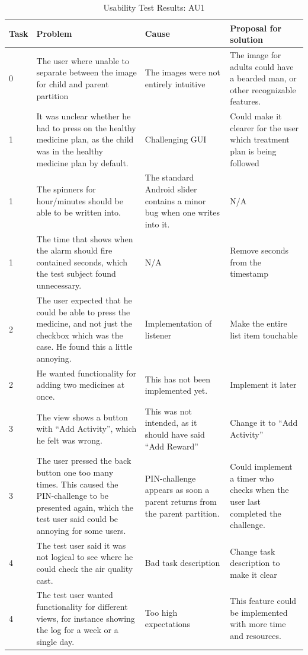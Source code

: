 \begin{singlespacing}
\begin{table}[H]
\centering
\begin{tabular}{| p{1.0cm} | p{4.0cm} | p{4.5cm} | p{4.0cm} |}
\hline
	\textbf{Task} & \textbf{Problem} & \textbf{Cause} & \textbf{Proposal for solution} \\
	\hline
	0 & The user where unable to separate between the image for child and parent partition & The images were not entirely intuitive & The image for adults could have a bearded man, or other recognizable features. \\
	\hline
	1 & It was unclear whether he had to press on the healthy medicine plan, as the child was in the healthy medicine plan by default. & Challenging GUI & Could make it clearer for the user which treatment plan is being followed \\
	\hline
	1 & The spinners for hour/minutes should be able to be written into. & The standard Android slider contains a minor bug when one writes into it.  & N/A \\
	\hline
	1 & The time that shows when the alarm should fire contained seconds, which the test subject found unnecessary. & N/A & Remove seconds from the timestamp \\
	\hline
	2 & The user expected that he could be able to press the medicine, and not just the checkbox which was the case. He found this a little annoying. & Implementation of listener & Make the entire list item touchable \\
	\hline
	2 & He wanted functionality for adding two medicines at once.  & This has not been implemented yet.  & Implement it later \\
	\hline
	3 & The view shows a button with ``Add Activity'', which he felt was wrong. & This was not intended, as it should have said ``Add Reward'' & Change it to ``Add Activity'' \\
	\hline
	3 & The user pressed the back button one too many times. This caused the PIN-challenge to be presented again, which the test user said could be annoying for some users.  & PIN-challenge appears as soon a parent returns from the parent partition. & Could implement a timer who checks when the user last completed the challenge.\\
	\hline
	4 & The test user said it was not logical to see where he could check the air quality cast. & Bad task description & Change task description to make it clear \\
	\hline
	4 & The test user wanted functionality for different views, for instance showing the log for a week or a single day. & Too high expectations & This feature could be implemented with more time and resources.  \\
	\hline
\end{tabular}
\caption{Usability Test Results: AU1}
\label{tab:testadult1}
\end{table}
\end{singlespacing}


